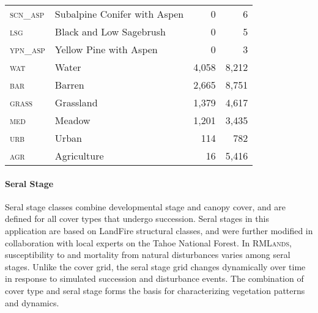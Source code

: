\begin{table}[!htbp]
\begin{tabular}{@{}llrr@{}}
                        \textsc{scn\_asp}     & Subalpine Conifer with Aspen                 & 0           & 6          \\
\rowcolor[HTML]{CAD6BA} \textsc{lsg     }     & Black and Low Sagebrush                      & 0           & 5          \\
                        \textsc{ypn\_asp}     & Yellow Pine with Aspen                       & 0           & 3          \\ 
\midrule
                        \textsc{wat     }     & Water                                        & 4,058       & 8,212      \\
\rowcolor[HTML]{CAD6BA} \textsc{bar     }     & Barren                                       & 2,665       & 8,751      \\
                        \textsc{grass   }     & Grassland                                    & 1,379       & 4,617      \\
\rowcolor[HTML]{CAD6BA} \textsc{med     }     & Meadow                                       & 1,201       & 3,435      \\
                        \textsc{urb     }     & Urban                                        & 114         & 782        \\
\rowcolor[HTML]{CAD6BA} \textsc{agr     }     & Agriculture                                  & 16          & 5,416      \\
\bottomrule

\end{tabular}
\end{table}
\normalsize

\paragraph{Seral Stage}
Seral stage classes combine developmental stage and canopy cover, and are defined for all cover types that undergo succession. Seral stages in this application are based on LandFire structural classes, and were further modified in collaboration with local experts on the Tahoe National Forest. In \textsc{RMLands}, susceptibility to and mortality from natural disturbances varies among seral stages. Unlike the cover grid, the seral stage grid changes dynamically over time in response to simulated succession and disturbance events. The combination of cover type and seral stage forms the basis for characterizing vegetation patterns and dynamics.

